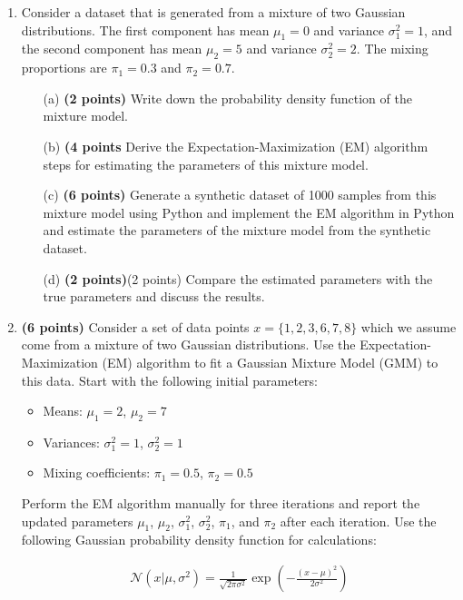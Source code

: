 \documentclass{article}
\begin{document}
\begin{enumerate}
    \item Consider a dataset that is generated from a mixture of two Gaussian distributions. The first component has mean \(\mu_1 = 0\) and variance \(\sigma_1^2 = 1\), and the second component has mean \(\mu_2 = 5\) and variance \(\sigma_2^2 = 2\). The mixing proportions are \(\pi_1 = 0.3\) and \(\pi_2 = 0.7\).
    \begin{enumerate}
        \item[(a)] \textbf{(2 points)} Write down the probability density function of the mixture model.
        \item[(b)] \textbf{(4 points} Derive the Expectation-Maximization (EM) algorithm steps for estimating the parameters of this mixture model.
        \item[(c)] \textbf{(6 points)} Generate a synthetic dataset of 1000 samples from this mixture model using Python and implement the EM algorithm in Python and estimate the parameters of the mixture model from the synthetic dataset.
        \item[(d)] \textbf{(2 points)}(2 points) Compare the estimated parameters with the true parameters and discuss the results.
    \end{enumerate}
    
    \item \textbf{(6 points)} Consider a set of data points \(x = \{1, 2, 3, 6, 7, 8\}\) which we assume come from a mixture of two Gaussian distributions. Use the Expectation-Maximization (EM) algorithm to fit a Gaussian Mixture Model (GMM) to this data. Start with the following initial parameters:

    \begin{itemize}
        \item Means: \(\mu_1 = 2\), \(\mu_2 = 7\)
        \item Variances: \(\sigma_1^2 = 1\), \(\sigma_2^2 = 1\)
        \item Mixing coefficients: \(\pi_1 = 0.5\), \(\pi_2 = 0.5\)
    \end{itemize}

    Perform the EM algorithm manually for three iterations and report the updated parameters \(\mu_1\), \(\mu_2\), \(\sigma_1^2\), \(\sigma_2^2\), \(\pi_1\), and \(\pi_2\) after each iteration. Use the following Gaussian probability density function for calculations:
    
    \begin{align*}
    \mathcal{N}(x | \mu, \sigma^2) = \frac{1}{\sqrt{2 \pi \sigma^2}} \exp\left(-\frac{(x - \mu)^2}{2 \sigma^2}\right)
    \end{align*}
    

\end{enumerate}
\end{document}
